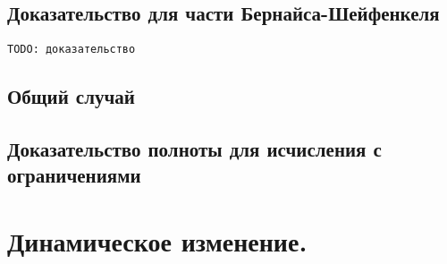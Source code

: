 \subsection{Доказательство для части Бернайса-Шейфенкеля}

% 
% 

\texttt{TODO: доказательство}

\subsection{Общий случай}

\subsection{Доказательство полноты для исчисления с ограничениями}

\section{Динамическое изменение.}
\label{sec:onlineChanging}